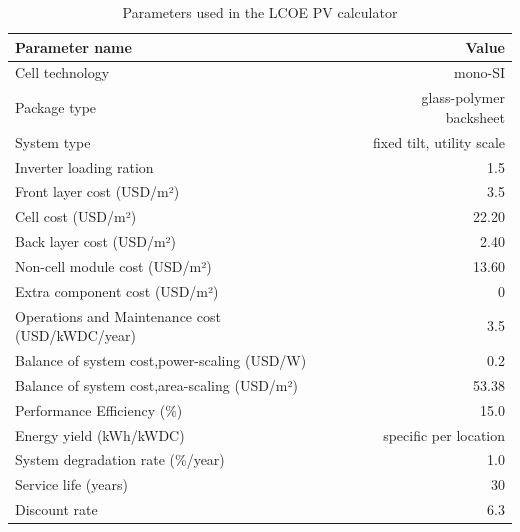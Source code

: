 \begin{table}[H]
  
  \caption{Parameters used in the LCOE PV calculator}\label{tab:parameters_pv_LCOE} \centering

  \begin{tabular}{|l|r|}
    \hline    
    \textbf{Parameter name} &   \textbf{Value} \\
    \hline
    Cell technology & mono-SI  \\
    \hline
    Package type  & glass-polymer backsheet \\
    \hline
    System type  & fixed tilt, utility scale \\
    \hline
    Inverter loading ration  & 1.5 \\
    \hline
    Front layer cost (USD/m²)   &  3.5 \\
    \hline
    Cell  cost (USD/m²)   &  22.20 \\
    \hline
    Back layer cost (USD/m²)   & 2.40 \\
    \hline
    Non-cell module cost (USD/m²)   &  13.60 \\
    \hline
    Extra component cost (USD/m²)   &  0 \\
    \hline
    Operations and Maintenance cost  (USD/kWDC/year)   &  3.5 \\
    \hline  
    Balance of system cost,power-scaling  (USD/W)   &  0.2 \\
    \hline  
    Balance of system cost,area-scaling  (USD/m²)   &  53.38 \\
    \hline  
    Performance Efficiency (\%) & 15.0  \\
    \hline
    Energy yield (kWh/kWDC) & specific per location \\
    \hline
    System degradation rate (\%/year)  & 1.0 \\
    \hline
    Service life (years) & 30 \\
    \hline
    Discount rate & 6.3 \\
    \hline
    

  \end{tabular}  
\end{table}


